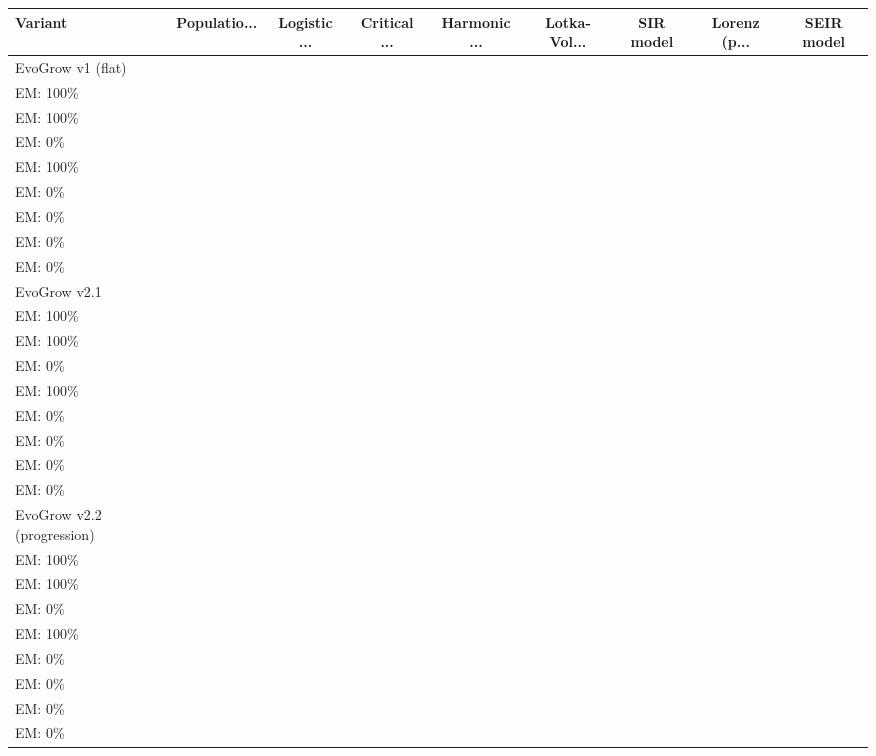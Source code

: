 
\begin{tabular}{lcccccccc}
\toprule
Variant & Populatio... & Logistic ... & Critical ... & Harmonic ... & Lotka-Vol... & SIR model & Lorenz (p... & SEIR model \\
\midrule
EvoGrow v1 (flat) & \makecell{$6.3 \times 10^{-12} \pm 0$\\EM: 100\%} & \makecell{$3.2 \times 10^{-8} \pm 0$\\EM: 100\%} & \makecell{$4.3 \times 10^{-15} \pm 0$\\EM: 0\%} & \makecell{$5.4 \times 10^{-14} \pm 0$\\EM: 100\%} & \makecell{$3.7 \times 10^{-4} \pm 1.7 \times 10^{-4}$\\EM: 0\%} & \makecell{$7.0 \times 10^{-5} \pm 0$\\EM: 0\%} & \makecell{$1.4 \times 10^{-3} \pm 1.7 \times 10^{-3}$\\EM: 0\%} & \makecell{$1.2 \times 10^{-3} \pm 9.6 \times 10^{-4}$\\EM: 0\%} \\
EvoGrow v2.1 & \makecell{$6.3 \times 10^{-12} \pm 0$\\EM: 100\%} & \makecell{$3.2 \times 10^{-8} \pm 0$\\EM: 100\%} & \makecell{$4.3 \times 10^{-15} \pm 0$\\EM: 0\%} & \makecell{$5.4 \times 10^{-14} \pm 0$\\EM: 100\%} & \makecell{$3.7 \times 10^{-4} \pm 1.7 \times 10^{-4}$\\EM: 0\%} & \makecell{$7.0 \times 10^{-5} \pm 0$\\EM: 0\%} & \makecell{$1.6 \times 10^{-3} \pm 1.5 \times 10^{-3}$\\EM: 0\%} & \makecell{$1.2 \times 10^{-3} \pm 9.6 \times 10^{-4}$\\EM: 0\%} \\
EvoGrow v2.2 (progression) & \makecell{$6.3 \times 10^{-12} \pm 0$\\EM: 100\%} & \makecell{$3.2 \times 10^{-8} \pm 0$\\EM: 100\%} & \makecell{$4.3 \times 10^{-15} \pm 0$\\EM: 0\%} & \makecell{$5.4 \times 10^{-14} \pm 0$\\EM: 100\%} & \makecell{$3.7 \times 10^{-4} \pm 1.7 \times 10^{-4}$\\EM: 0\%} & \makecell{$7.0 \times 10^{-5} \pm 0$\\EM: 0\%} & \makecell{$7.4 \times 10^{-4} \pm 4.1 \times 10^{-4}$\\EM: 0\%} & \makecell{$1.2 \times 10^{-3} \pm 9.6 \times 10^{-4}$\\EM: 0\%} \\

\end{tabular}
